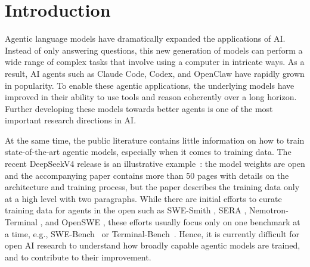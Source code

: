 \documentclass{article}
\begin{document}
\section{Introduction}
\label{sec:intro}

Agentic language models have dramatically expanded the applications of AI.
Instead of only answering questions, this new generation of models can perform a wide range of complex tasks that involve using a computer in intricate ways.
As a result, AI agents such as Claude Code, Codex, and OpenClaw have rapidly grown in popularity.
To enable these agentic applications, the underlying models have improved in their ability to use tools and reason coherently over a long horizon.
Further developing these models towards better agents is one of the most important research directions in AI.

At the same time, the public literature contains little information on how to train state-of-the-art agentic models, especially when it comes to training data.
The recent DeepSeekV4 release is an illustrative example~\citep{dsv4}: the model weights are open and the accompanying paper contains more than 50 pages with details on the architecture and training process, but the paper describes the training data only at a high level with two paragraphs.
While there are initial efforts to curate training data for agents in the open such as SWE-Smith \citep{yang2025swesmithscalingdatasoftware}, SERA \citep{shen2026serasoftverifiedefficientrepository}, Nemotron-Terminal \citep{pi2026dataengineeringscalingllm}, and OpenSWE \citep{fu2026davincienvopensweenvironment}, these efforts usually focus only on one benchmark at a time, e.g., SWE-Bench~\citep{jimenez2024swebenchlanguagemodelsresolve} or Terminal-Bench~\citep{merrill2026terminalbenchbenchmarkingagentshard}.
Hence, it is currently difficult for open AI research to understand how broadly capable agentic models are trained, and to contribute to their improvement.
\end{document}
